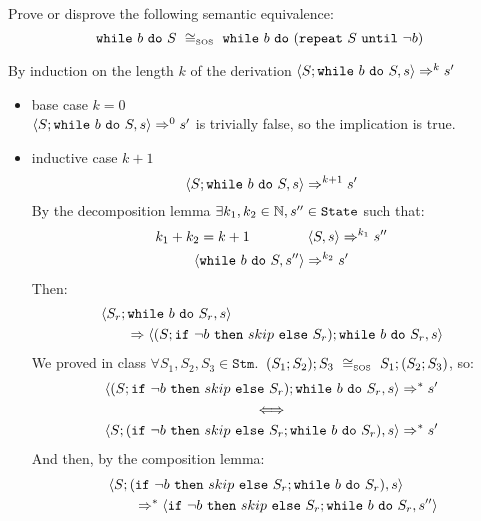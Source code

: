 \begin{exercise}{
    Prove or disprove the following semantic equivalence:
    \[ \wwhile{b}{S}\ \SOScong\ \wwhile{b}{(\wrepeat{S}{\neg b})}  \]
}
\begin{itemize}
\begin{itemize}
                    By induction on the length $k$ of the derivation $\left<S;\texttt{while}\ b\ \texttt{do}\ S, s\right> \Rightarrow^k s'$
                    \begin{itemize}
                        \item base case $k=0$ \\
                            $\left<S;\texttt{while}\ b\ \texttt{do}\ S, s\right> \Rightarrow^0 s'$ is trivially false, so the implication is true.
                        \item inductive case $k+1$ \vspace*{-0.3cm}
                            \[ \left<S;\texttt{while}\ b\ \texttt{do}\ S, s\right> \Rightarrow^{k+1} s' \]
                            By the decomposition lemma $\exists k_1, k_2 \in \mathbb{N}, s'' \in \texttt{State}$ such that:
                            \begin{gather*}
                                k_1 + k_2 = k + 1\qquad\qquad \left<S, s\right> \Rightarrow^{k_1} s'' \\
                                \left<\texttt{while}\ b\ \texttt{do}\ S, s''\right> \Rightarrow^{k_2} s'
                            \end{gather*}
                            Then:
                            \begin{align*}
                                &\left<S_r; \texttt{while}\ b\ \texttt{do}\ S_r, s\right>
                                \\&\qquad\Rightarrow \left<(S;\texttt{if}\ \neg b\ \texttt{then}\ skip\ \texttt{else}\ S_r); \texttt{while}\ b\ \texttt{do}\ S_r, s\right>
                            \end{align*}
                            We proved in class $\forall S_1, S_2, S_3 \in \texttt{Stm}$.\ $(S_1;S_2);S_3\ \cong_{\text{\tiny SOS}}\ S_1;(S_2;S_3)$, so:
                            \begin{gather*}
                                \left<(S;\texttt{if}\ \neg b\ \texttt{then}\ skip\ \texttt{else}\ S_r); \texttt{while}\ b\ \texttt{do}\ S_r, s\right> \Rightarrow^* s'
                                \\
                                \iff
                                \\
                                \left<S;(\texttt{if}\ \neg b\ \texttt{then}\ skip\ \texttt{else}\ S_r; \texttt{while}\ b\ \texttt{do}\ S_r), s\right> \Rightarrow^* s'
                            \end{gather*}
                            And then, by the composition lemma:
                            \begin{align*}
                                &\instr{S;(\wif{\neg b}{skip}{S_r}; \wwhile{b}{S_r})}{s}
                                \\&\qquad\Rightarrow^* \instr{\wif{\neg b}{skip}{S_r}; \wwhile{b}{S_r}}{s''}

\end{align*}
\end{itemize}
\end{itemize}
\end{itemize}
\end{exercise}
